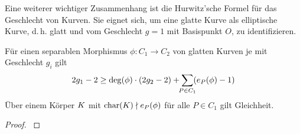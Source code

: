 Eine weiterer wichtiger Zusammenhang ist die Hurwitz'sche Formel für
das Geschlecht von Kurven. Sie eignet sich, um eine glatte Kurve als
elliptische Kurve, d.\,h. glatt und vom Geschlecht $g=1$ mit
Basispunkt $O$, zu identifizieren.

\begin{Satz}[Hurwitz]\label{hurwitz}
  Für einen separablen Morphismus $\phi\colon C_1\to C_2$ von
  glatten Kurven 
  je mit Geschlecht $g_i$ gilt
  \begin{gather*}
    2g_1-2
    \geq
    \deg(\phi)\cdot(2g_2-2) + \sum_{\mathclap{P\in C_1}}(e_P(\phi)-1)
  \end{gather*}
  Über einem Körper $K$ mit 
  $\operatorname{char}(K)\nmid e_P(\phi)$ für alle $P\in C_1$ 
  gilt Gleichheit.
  \begin{proof}
    \cite[siehe][Theorem II.5.9]{silverman}
  \end{proof}
\end{Satz}


